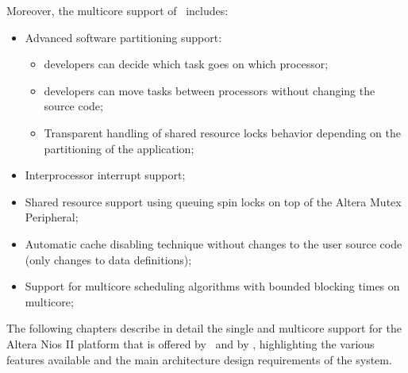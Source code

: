 Moreover, the multicore support of \ee\ includes:
\begin{itemize}
\item Advanced software partitioning support:
\begin{itemize}
\item developers can decide which task goes on which processor;
\item developers can move tasks between processors without
  changing the source code;
\item Transparent handling of shared resource locks behavior
  depending on the partitioning of the application;
\end{itemize}
\item Interprocessor interrupt support;
\item Shared resource support using queuing spin locks on top of the
Altera Mutex Peripheral;
\item Automatic cache disabling technique without changes to the
user source code (only changes to data definitions);
\item Support for multicore scheduling algorithms with bounded
blocking times on multicore;
\end{itemize}

The following chapters describe in detail the single and multicore
support for the Altera Nios II platform that is offered by \ee\ and by
\rtd, highlighting the various features available and the main
architecture design requirements of the system.

%
%
%
%
%
